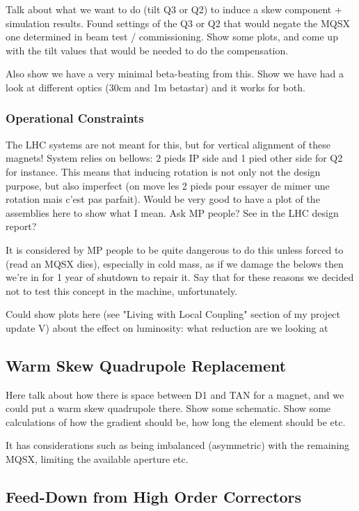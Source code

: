 Talk about what we want to do (tilt Q3 or Q2) to induce a skew component + simulation results.
Found settings of the Q3 or Q2 that would negate the MQSX one determined in beam test / commissioning.
Show some plots, and come up with the tilt values that would be needed to do the compensation.

Also show we have a very minimal beta-beating from this.
Show we have had a look at different optics (30cm and 1m betastar) and it works for both.

\subsubsection{Operational Constraints}

The LHC systems are not meant for this, but for vertical alignment of these magnets!
System relies on bellows: 2 pieds IP side and 1 pied other side for Q2 for instance.
This means that inducing rotation is not only not the design purpose, but also imperfect (on move les 2 pieds pour essayer de mimer une rotation mais c'est pas parfait).
Would be very good to have a plot of the assemblies here to show what I mean. Ask MP people? See in the LHC design report?

It is considered by MP people to be quite dangerous to do this unless forced to (read an MQSX dies), especially in cold mass, as if we damage the belows then we're in for 1 year of shutdown to repair it.
Say that for these reasons we decided not to test this concept in the machine, unfortunately.

Could show plots here (see "Living with Local Coupling" section of my project update V) about the effect on luminosity: what reduction are we looking at 

\subsection{Warm Skew Quadrupole Replacement}

Here talk about how there is space between D1 and TAN for a magnet, and we could put a warm skew quadrupole there.
Show some schematic.
Show some calculations of how the gradient should be, how long the element should be etc.

It has considerations such as being imbalanced (asymmetric) with the remaining MQSX, limiting the available aperture etc.

\subsection{Feed-Down from High Order Correctors}

